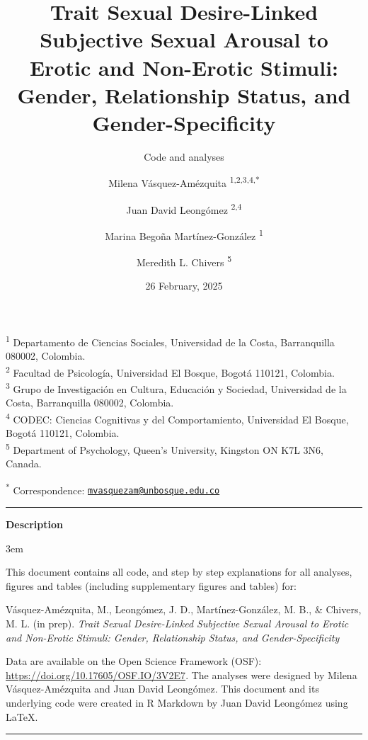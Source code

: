 \documentclass[
  bookmarksnumbered]{article}
\title{Trait Sexual Desire-Linked Subjective Sexual Arousal to Erotic and Non-Erotic Stimuli: Gender, Relationship Status, and Gender-Specificity}
\subtitle{Code and analyses}
\author{Milena Vásquez-Amézquita \orcidlink{0000-0001-7317-8430}\textsuperscript{1,2,3,4,*} \and Juan David Leongómez \orcidlink{0000-0002-0092-6298}\textsuperscript{2,4} \and Marina Begoña Martínez-González \orcidlink{0000-0002-5840-6383}\textsuperscript{1} \and Meredith L. Chivers \orcidlink{0000-0002-5495-9263}\textsuperscript{5}}
\date{26 February, 2025}
\begin{document}
\maketitle

\textsuperscript{1} Departamento de Ciencias Sociales, Universidad de la Costa, Barranquilla 080002, Colombia.\\
\textsuperscript{2} Facultad de Psicología, Universidad El Bosque, Bogotá 110121, Colombia.\\
\textsuperscript{3} Grupo de Investigación en Cultura, Educación y Sociedad, Universidad de la Costa, Barranquilla 080002, Colombia.\\
\textsuperscript{4} CODEC: Ciencias Cognitivas y del Comportamiento, Universidad El Bosque, Bogotá 110121, Colombia.\\
\textsuperscript{5} Department of Psychology, Queen's University, Kingston ON K7L 3N6, Canada.

\textsuperscript{*} Correspondence: \href{mailto:mvasquezam@unbosque.edu.co}{\href{mailto:mvasquezam@unbosque.edu.co}{\nolinkurl{mvasquezam@unbosque.edu.co}}}

\begin{center}\rule{0.5\linewidth}{0.5pt}\end{center}

\begin{center}
\textbf{Description}
\end{center}

\par
\begingroup
\leftskip3em
\rightskip\leftskip

This document contains all code, and step by step explanations for all analyses, figures and tables (including supplementary figures and tables) for:

\begin{hangparas}{.25in}{1}
Vásquez-Amézquita, M., Leongómez, J. D., Martínez-González, M. B., \& Chivers, M. L. (in prep). \textit{Trait Sexual Desire-Linked Subjective Sexual Arousal to Erotic and Non-Erotic Stimuli: Gender, Relationship Status, and Gender-Specificity}
\end{hangparas}

Data are available on the Open Science Framework (OSF): \url{https://doi.org/10.17605/OSF.IO/3V2E7}. The analyses were designed by Milena Vásquez-Amézquita and Juan David Leongómez. This document and its underlying code were created in R Markdown by Juan David Leongómez using \LaTeX.

\begin{center}\rule{0.5\linewidth}{0.5pt}\end{center}
\end{document}
